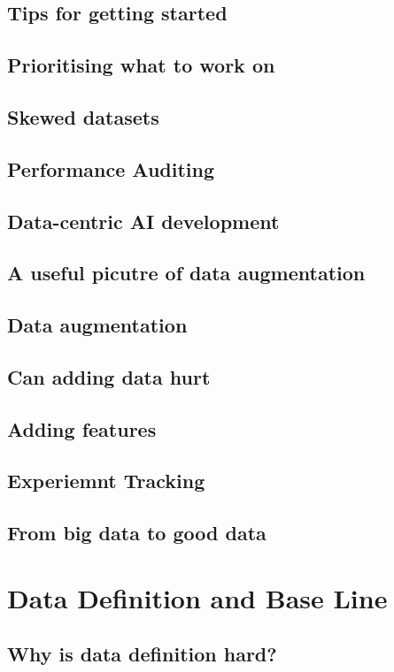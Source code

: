 \subsection{Tips for getting started}
\subsection{Prioritising what to work on}
\subsection{Skewed datasets}
\subsection{Performance Auditing}
\subsection{Data-centric AI development}
\subsection{A useful picutre of data augmentation}
\subsection{Data augmentation}
\subsection{Can adding data hurt}
\subsection{Adding features}
\subsection{Experiemnt Tracking}
\subsection{From big data to good data}


\section{Data Definition and Base Line}
\subsection{Why is data definition hard?}
